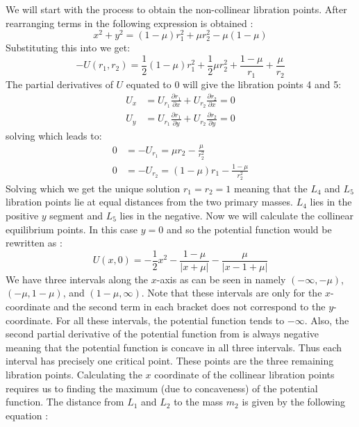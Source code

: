 %
We will start with the process to obtain the non-collinear libration points. After rearranging terms in  the following expression is obtained \cite{invariant}:
\begin{equation}
x^2 + y^2 = (1-\mu)r_1^2 + \mu r_2^2 - \mu (1-\mu)
\end{equation}
%
Substituting this into  we get:
\begin{equation}
-U(r_1, r_2) = \frac{1}{2}(1-\mu)r_1^2 + \frac{1}{2}\mu r_2^2 + \frac{1-\mu}{r_1} + \frac{\mu}{r_2}
\end{equation}
%
The partial derivatives of $U$ equated to 0 will give the libration points 4 and 5:
\begin{equation}
\begin{aligned}
U_x &= U_{r_1} \frac{\partial r_1}{\partial x} + U_{r_2} \frac{\partial r_2}{\partial x} = 0 \\
U_y &= U_{r_1} \frac{\partial r_1}{\partial y} + U_{r_2} \frac{\partial r_2}{\partial y} = 0
\end{aligned}
\end{equation}
%
solving which leads to:
\begin{equation}
\begin{aligned}
0 &= -U_{r_1} = \mu r_2 - \frac{\mu}{r_2^2} \\
0 &= -U_{r_2} = (1-\mu) r_1 - \frac{1-\mu}{r_2^2}
\end{aligned}
\end{equation}
%
Solving which we get the unique solution $r_1=r_2=1$ meaning that the $L_4$ and $L_5$ libration points lie at equal distances from the two primary masses. $L_4$ lies in the positive $y$ segment and $L_5$ lies in the negative. Now we will calculate the collinear equilibrium points. In this case $y=0$ and so the potential function would be rewritten as \cite{invariant}:
\begin{equation}
\label{pot_coll}
U(x,0) = -\frac{1}{2}x^2 - \frac{1-\mu}{|x+\mu|} - \frac{\mu}{|x - 1 + \mu|}
\end{equation}
%
We have three intervals along the $x$-axis as can be seen in  namely $(-\infty, -\mu )$, $(-\mu, 1-\mu )$, and $(1- \mu , \infty)$. Note that these intervals are only for the $x$-coordinate and the second term in each bracket does not correspond to the $y$-coordinate. For all these intervals, the potential function tends to $-\infty$. Also, the second partial derivative of the potential function from  is always negative meaning that the potential function is concave in all three intervals. Thus each interval has precisely one critical point. These points are the three remaining libration points. Calculating the $x$ coordinate of the collinear libration points requires us to finding the maximum (due to concaveness) of the potential function. The distance from $L_1$ and $L_2$ to the mass $m_2$ is given by the following equation \cite{invariant}:

